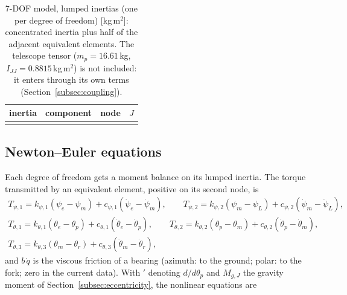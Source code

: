\documentclass[10pt,a4paper]{article}
\numberwithin{equation}{section}
\begin{document}
\begin{table}[H]\centering\small
\caption{7-DOF model, lumped inertias (one per degree of freedom) [kg\,m$^2$]: concentrated inertia plus half of the adjacent equivalent elements. The telescope tensor ($m_p = 16.61$\,kg, $I_{JJ} = 0.8815$\,kg\,m$^2$) is not included: it enters through its own terms (Section~\ref{subsec:coupling}).}\label{tab:lump7_nd}
\begin{tabularx}{\linewidth}{lYlr}\toprule inertia & component & node & $J$ \\ \midrule
\\ \bottomrule\end{tabularx}\end{table}
\subsection{Newton--Euler equations}\label{subsec:ne7}
Each degree of freedom gets a moment balance on its lumped inertia. The torque transmitted by an equivalent element, positive on its second node, is
\begin{gather}
T_{\psi,1} = k_{\psi,1}(\psi_e - \psi_m) + c_{\psi,1}(\dot\psi_e - \dot\psi_m),\qquad T_{\psi,2} = k_{\psi,2}(\psi_m - \psi_L) + c_{\psi,2}(\dot\psi_m - \dot\psi_L),\\
T_{\theta,1} = k_{\theta,1}(\theta_e - \theta_p) + c_{\theta,1}(\dot\theta_e - \dot\theta_p),\qquad T_{\theta,2} = k_{\theta,2}(\theta_p - \theta_m) + c_{\theta,2}(\dot\theta_p - \dot\theta_m),\\
T_{\theta,3} = k_{\theta,3}(\theta_m - \theta_r) + c_{\theta,3}(\dot\theta_m - \dot\theta_r),
\end{gather}
and $b\,\dot q$ is the viscous friction of a bearing (azimuth: to the ground; polar: to the fork; zero in the current data). With $'$ denoting $d/d\theta_p$ and $M_{g,J}$ the gravity moment of Section~\ref{subsec:eccentricity}, the nonlinear equations are
\end{document}
